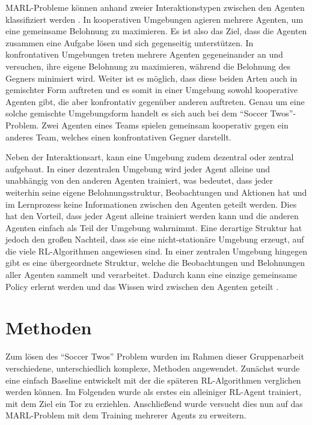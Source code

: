 \documentclass[twocolumn]{webofc}
\begin{document}
\ac{MARL}-Probleme können anhand zweier Interaktionstypen zwischen den Agenten klassifiziert werden \cite{10.1007/11691839_1}. In kooperativen Umgebungen agieren mehrere Agenten, um eine gemeinsame Belohnung zu maximieren. Es ist also das Ziel, dass die Agenten zusammen eine Aufgabe lösen und sich gegenseitig unterstützen. In konfrontativen Umgebungen treten mehrere Agenten gegeneinander an und versuchen, ihre eigene Belohnung zu maximieren, während die Belohnung des Gegners minimiert wird.
Weiter ist es möglich, dass diese beiden Arten auch in gemischter Form auftreten und es somit in einer Umgebung sowohl kooperative Agenten gibt, die aber konfrontativ gegenüber anderen auftreten. Genau um eine solche gemischte Umgebungsform handelt es sich auch bei dem \enquote{Soccer Twos}-Problem. Zwei Agenten eines Teams spielen gemeinsam kooperativ gegen ein anderes Team, welches einen konfrontativen Gegner darstellt.

Neben der Interaktionsart, kann eine Umgebung zudem dezentral oder zentral aufgebaut. In einer dezentralen Umgebung wird jeder Agent alleine und unabhängig von den anderen Agenten trainiert, was bedeutet, dass jeder weiterhin seine eigene Belohnungsstruktur, Beobachtungen und Aktionen hat und im Lernprozess keine Informationen zwischen den Agenten geteilt werden. Dies hat den Vorteil, dass jeder Agent alleine trainiert werden kann und die anderen Agenten einfach als Teil der Umgebung wahrnimmt. Eine derartige Struktur hat jedoch den großen Nachteil, dass sie eine nicht-stationäre Umgebung erzeugt, auf die viele \ac{RL}-Algorithmen angewiesen sind.
In einer zentralen Umgebung hingegen gibt es eine übergeordnete Struktur, welche die Beobachtungen und Belohnungen aller Agenten sammelt und verarbeitet. Dadurch kann eine einzige gemeinsame Policy erlernt werden und das Wissen wird zwischen den Agenten geteilt \cite{Tan:1993}. %



\section{Methoden} \label{sec-1}

Zum lösen des \enquote{Soccer Twos} Problem wurden im Rahmen dieser Gruppenarbeit verschiedene, unterschiedlich komplexe, Methoden angewendet. Zunächst wurde eine einfach Baseline entwickelt mit der die späteren \ac{RL}-Algorithmen verglichen werden können. Im Folgenden wurde als erstes ein alleiniger \ac{RL}-Agent trainiert, mit dem Ziel ein Tor zu erziehlen. Anschließend wurde versucht dies nun auf das \ac{MARL}-Problem mit dem Training mehrerer Agents zu erweitern.
\end{document}
